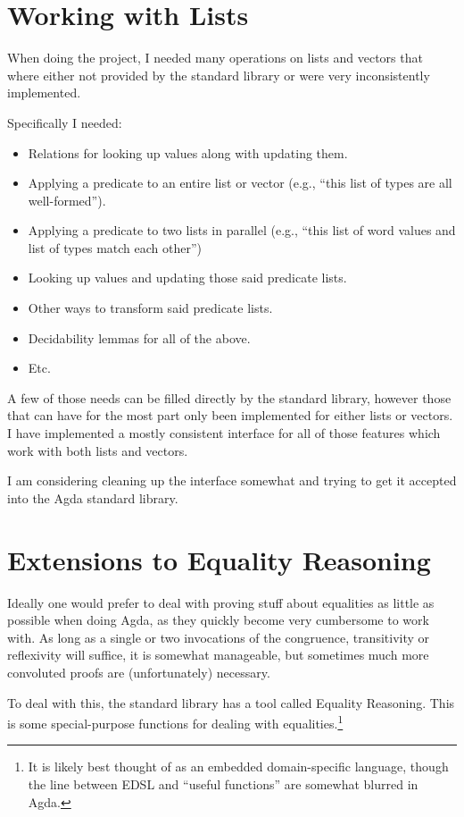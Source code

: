 \section{Working with Lists}
When doing the project, I needed many operations on lists and vectors that where
either not provided by the standard library or were very inconsistently
implemented.

Specifically I needed:

\begin{itemize}
\item Relations for looking up values along with updating them.
\item Applying a predicate to an entire list or vector (e.g., ``this list of types are all well-formed'').
\item Applying a predicate to two lists in parallel (e.g., ``this list of word values and list of types match each other'')
\item Looking up values and updating those said predicate lists.
\item Other ways to transform said predicate lists.
\item Decidability lemmas for all of the above.
\item Etc.
\end{itemize}

A few of those needs can be filled directly by the standard library, however
those that can have for the most part only been implemented for either lists or
vectors. I have implemented a mostly consistent interface for all of those
features which work with both lists and vectors.

I am considering cleaning up the interface somewhat and trying to get it
accepted into the Agda standard library.

\section{Extensions to Equality Reasoning}
Ideally one would prefer to deal with proving stuff about equalities as little
as possible when doing Agda, as they quickly become very cumbersome to work
with. As long as a single or two invocations of the congruence, transitivity or
reflexivity will suffice, it is somewhat manageable, but sometimes much more
convoluted proofs are (unfortunately) necessary.

To deal with this, the standard library has a tool called Equality
Reasoning. This is some special-purpose functions for dealing with
equalities.\footnote{It is likely best thought of as an embedded domain-specific
  language, though the line between EDSL and ``useful functions'' are somewhat
  blurred in Agda.}

